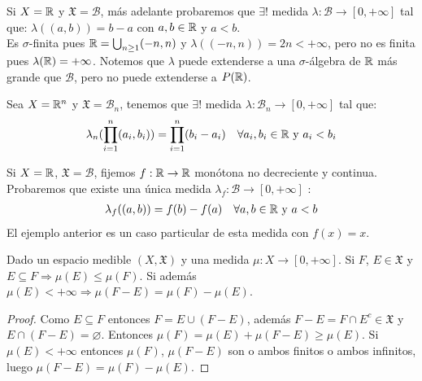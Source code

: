 \begin{eg}
    Si $X = \mathbb{R}$ y $\mathfrak{X} = \mathcal{B}$, más adelante probaremos que $\exists !$ medida $\lambda : \mathcal{B} \to [0, +\infty]$ tal que:
    $\lambda((a, b)) = b-a$ con $a, b \in \mathbb{R}$ y $a < b$. \\
    Es $\sigma$-finita pues $\mathbb{R} = \bigcup_{n \geq 1} (-n, n)$ y $\lambda((-n, n)) = 2n < +\infty$, pero no es finita pues $\lambda(\mathbb{R}) = +\infty$.
    Notemos que $\lambda$ puede extenderse a una $\sigma$-álgebra de $\mathbb{R}$ más grande que $\mathcal{B}$, pero no puede extenderse a $P(\mathbb{R})$.
\end{eg}

\begin{eg}
    Sea $X = \mathbb{R}^n$ y $ \mathfrak{X} = \mathcal{B}_n$, tenemos que $\exists!$ medida $\lambda : \mathcal{B}_n \to [0, +\infty]$ tal que:
    \begin{align*}
        \lambda_n(\prod_{i = 1}^n (a_i, b_i)) = \prod_{i = 1}^n (b_i - a_i) \quad \forall a_i, b_i \in \mathbb{R} \text{ y } a_i < b_i
    \end{align*}
\end{eg}

\clearpage

\begin{eg}
    Si $X = \mathbb{R}$, $\mathfrak{X} = \mathcal{B}$, fijemos $f: \mathbb{R} \to \mathbb{R}$ monótona no decreciente y continua. Probaremos que existe una única medida $\lambda_f : \mathcal{B} \to [0, +\infty]$ :
    \begin{align*}
        \lambda_f((a, b)) = f(b) - f(a) \quad \forall a, b \in \mathbb{R} \text{ y } a < b
    \end{align*}
    El ejemplo anterior es un caso particular de esta medida con $f(x) = x$.
\end{eg}

\begin{lemma}
    Dado un espacio medible $(X, \mathfrak{X})$ y una medida $\mu : X \to [0, +\infty]$. Si $F$, $E \in \mathfrak{X}$ y $E \subseteq F \Rightarrow \mu(E) \leq \mu(F)$.
    Si además $\mu(E) < +\infty \Rightarrow \mu(F - E) = \mu(F) - \mu(E)$.
    \begin{proof}
        Como $E \subseteq F$ entonces $F = E \cup (F - E)$, además $F - E = F \cap E^c \in \mathfrak{X}$ y $E \cap (F - E) = \varnothing$.
        Entonces $\mu(F) = \mu(E) + \mu(F - E) \geq \mu(E)$.
        Si $\mu(E) < +\infty$ entonces $\mu(F)$, $\mu(F - E)$ son o ambos finitos o ambos infinitos, luego $\mu(F - E) = \mu(F) - \mu(E)$.
    \end{proof}
\end{lemma}

